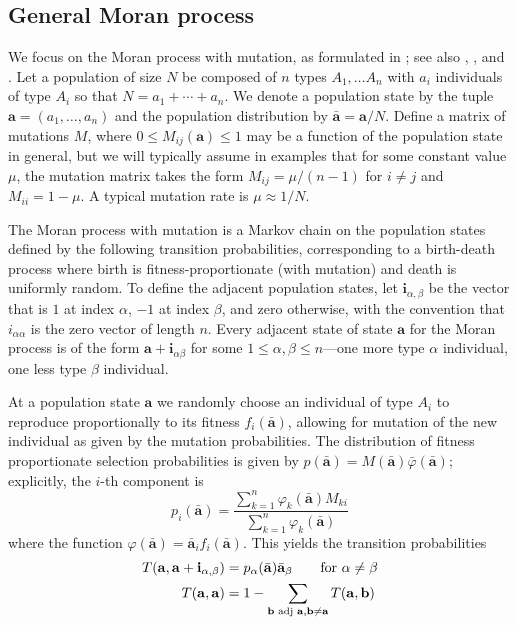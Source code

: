 \documentclass[aps,prd,11pt,notitlepage,nofootinbib,superscriptaddress,showkeys,letterpaper]{revtex4-1}
\newcommand{\incentive}{\varphi}
\begin{document}
\subsection{General Moran process}

We focus on the Moran process with mutation, as formulated in \cite{harper2016}; see also \cite{fudenberg2004stochastic}, \cite{claussen2005non}, and \cite{moran1962statistical}. Let a population  of size $N$ be composed of $n$ types $A_1, \ldots A_n$ with $a_i$ individuals of type $A_i$ so that $N = a_1 + \cdots + a_n$. We denote a population state by the tuple $\mathbf{a} = (a_1, \ldots, a_n)$ and the population distribution by $\bar{\mathbf{a}} = \mathbf{a} / N$. Define a matrix of mutations $M$, where $0 \leq M_{i j}(\mathbf{a}) \leq 1$ may be a function of the population state in general, but we will typically assume in examples that for some constant value $\mu$, the mutation matrix takes the form $M_{i j} = \mu / (n-1)$ for $i \neq j$ and $M_{i i} = 1 - \mu$. A typical mutation rate is $\mu \approx 1/N$.

The Moran process with mutation is a Markov chain on the population states defined by the following transition probabilities, corresponding to a birth-death process where birth is fitness-proportionate (with mutation) and death is uniformly random. To define the adjacent population states, let $\mathbf{i}_{\alpha,\beta}$ be the vector that is $1$ at index $\alpha$, $-1$ at index $\beta$, and zero otherwise, with the convention that $i_{\alpha \alpha}$ is the zero vector of length $n$. Every adjacent state of state $\mathbf{a}$ for the Moran process is of the form $\mathbf{a} + \mathbf{i}_{\alpha \beta}$ for some $1 \leq \alpha, \beta \leq n$---one more type $\alpha$ individual, one less type $\beta$ individual.

At a population state $\mathbf{a}$ we randomly choose an individual of type $A_i$ to reproduce proportionally to its fitness $f_i(\bar{\mathbf{a}})$, allowing for mutation of the new individual as given by the mutation probabilities. The distribution of fitness proportionate selection probabilities is given by $p(\bar{\mathbf{a}}) = M(\bar{\mathbf{a}}) \bar{\incentive}(\bar{\mathbf{a}})$; explicitly, the $i$-th component is
\begin{equation}
p_i(\bar{\mathbf{a}}) = \frac{\sum_{k=1}^{n}{\incentive_k(\bar{\mathbf{a}}) M_{k i} }}{\sum_{k=1}^{n}{\incentive_k(\bar{\mathbf{a}})}}
\label{fitness-proportionate-reproduction} 
\end{equation}
where the function $\incentive(\bar{\mathbf{a}}) = \bar{\mathbf{a}}_i f_i(\bar{\mathbf{a}})$. This yields the transition probabilities
\begin{align}
T(\mathbf{a},\mathbf{a} + \mathbf{i}_{\alpha, \beta}) &= p_{\alpha}(\bar{\mathbf{a}}) \bar{\mathbf{a}}_{\beta} \qquad \text{for $\alpha \neq \beta$} \notag \\
T(\mathbf{a},\mathbf{a}) &= 1 - \sum_{\mathbf{b} \text{ adj } \mathbf{a}, \mathbf{b}\neq \mathbf{a}}{T(\mathbf{a},\mathbf{b})}
\label{moran_process}
\end{align}
\end{document}
